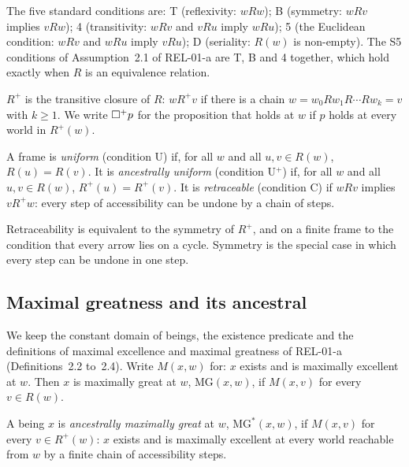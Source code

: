 \documentclass{situationist-preprint}
\newcommand{\MG}{\mathrm{MG}}
\newcommand{\MGs}{\mathrm{MG}^{*}}
\newcommand{\Rp}{R^{+}}
\newcommand{\nplus}{\nec^{+}}
\begin{document}
\begin{definition}\label{d:std}
The five standard conditions are: T (reflexivity: $wRw$); B (symmetry: $wRv$ implies $vRw$); 4 (transitivity: $wRv$ and $vRu$ imply $wRu$); 5 (the Euclidean condition: $wRv$ and $wRu$ imply $vRu$); D (seriality: $R(w)$ is non-empty). The S5 conditions of Assumption~2.1 of REL-01-a are T, B and 4 together, which hold exactly when $R$ is an equivalence relation.
\end{definition}

\begin{definition}\label{d:ancestral}
$\Rp$ is the transitive closure of $R$: $w\Rp v$ if there is a chain $w = w_0 R w_1 R \cdots R w_k = v$ with $k \geq 1$. We write $\nplus p$ for the proposition that holds at $w$ if $p$ holds at every world in $\Rp(w)$.
\end{definition}

\begin{definition}\label{d:conds}
A frame is \emph{uniform} (condition U) if, for all $w$ and all $u, v \in R(w)$, $R(u) = R(v)$. It is \emph{ancestrally uniform} (condition U$^+$) if, for all $w$ and all $u, v \in R(w)$, $\Rp(u) = \Rp(v)$. It is \emph{retraceable} (condition C) if $wRv$ implies $v \Rp w$: every step of accessibility can be undone by a chain of steps.
\end{definition}

Retraceability is equivalent to the symmetry of $\Rp$, and on a finite frame to the condition that every arrow lies on a cycle. Symmetry is the special case in which every step can be undone in one step.

\subsection{Maximal greatness and its ancestral}

We keep the constant domain of beings, the existence predicate and the definitions of maximal excellence and maximal greatness of REL-01-a (Definitions~2.2 to~2.4). Write $M(x,w)$ for: $x$ exists and is maximally excellent at $w$. Then $x$ is maximally great at $w$, $\MG(x,w)$, if $M(x,v)$ for every $v \in R(w)$.

\begin{definition}\label{d:mgstar}
A being $x$ is \emph{ancestrally maximally great} at $w$, $\MGs(x,w)$, if $M(x,v)$ for every $v \in \Rp(w)$: $x$ exists and is maximally excellent at every world reachable from $w$ by a finite chain of accessibility steps.
\end{definition}
\end{document}

